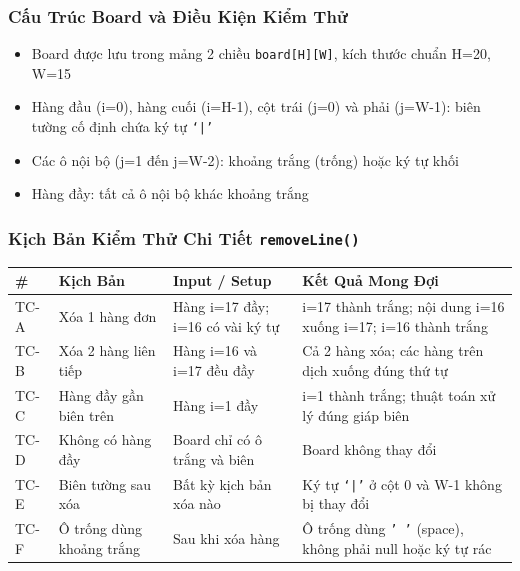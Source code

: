 \documentclass[12pt,a4paper]{article}
\begin{document}
\subsubsection{Cấu Trúc Board và Điều Kiện Kiểm Thử}
\begin{itemize}[leftmargin=3em]
  \item Board được lưu trong mảng 2 chiều \texttt{board[H][W]}, kích thước chuẩn H=20, W=15
  \item Hàng đầu (i=0), hàng cuối (i=H-1), cột trái (j=0) và phải (j=W-1): biên tường cố định chứa ký tự \texttt{`|'}
  \item Các ô nội bộ (j=1 đến j=W-2): khoảng trắng (trống) hoặc ký tự khối
  \item Hàng đầy: tất cả ô nội bộ khác khoảng trắng
\end{itemize}

\subsubsection{Kịch Bản Kiểm Thử Chi Tiết \texttt{removeLine()}}

\begin{table}[H]
\centering
{}
\begin{tabularx}{\linewidth}{|l|X|X|X|}
\hline
\rowcolor{gray!35}
\textbf{\#} & \textbf{Kịch Bản} & \textbf{Input / Setup} & \textbf{Kết Quả Mong Đợi} \\ \hline
TC-A & Xóa 1 hàng đơn             & Hàng i=17 đầy; i=16 có vài ký tự & i=17 thành trắng; nội dung i=16 xuống i=17; i=16 thành trắng \\ \hline
TC-B & Xóa 2 hàng liên tiếp       & Hàng i=16 và i=17 đều đầy & Cả 2 hàng xóa; các hàng trên dịch xuống đúng thứ tự \\ \hline
TC-C & Hàng đầy gần biên trên     & Hàng i=1 đầy & i=1 thành trắng; thuật toán xử lý đúng giáp biên \\ \hline
TC-D & Không có hàng đầy          & Board chỉ có ô trắng và biên & Board không thay đổi \\ \hline
TC-E & Biên tường sau xóa         & Bất kỳ kịch bản xóa nào & Ký tự \texttt{`|'} ở cột 0 và W-1 không bị thay đổi \\ \hline
TC-F & Ô trống dùng khoảng trắng  & Sau khi xóa hàng & Ô trống dùng \texttt{' '} (space), không phải null hoặc ký tự rác \\ \hline
\end{tabularx}
\end{table}
\end{document}
